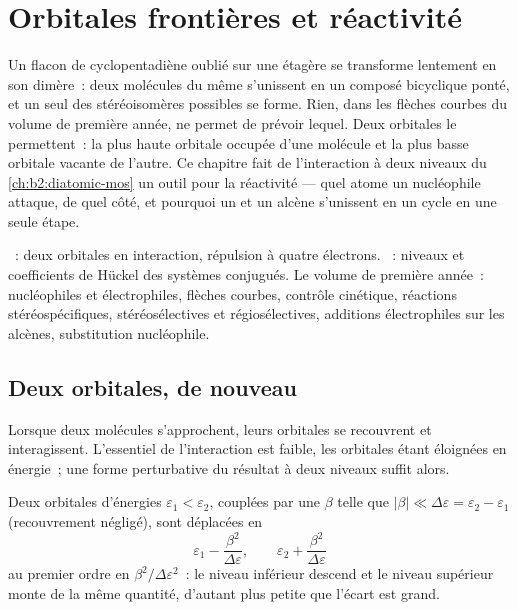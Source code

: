 \chapter{Orbitales frontières et réactivité}\label{ch:b2:frontier-orbitals}

Un flacon de cyclopentadiène oublié sur une étagère se transforme lentement en son dimère~:
deux molécules du même  s'unissent en un composé bicyclique ponté, et
un seul des stéréoisomères possibles se forme. Rien, dans les flèches courbes du
volume de première année, ne permet de prévoir lequel. Deux orbitales le permettent~: la plus haute orbitale
occupée d'une molécule et la plus basse orbitale vacante de l'autre. Ce
chapitre fait de l'interaction à deux niveaux du \cref{ch:b2:diatomic-mos} un
outil pour la réactivité --- quel atome un nucléophile attaque, de quel côté, et
pourquoi un  et un alcène s'unissent en un cycle en une seule étape.

\begin{recall}
~: deux orbitales en interaction, répulsion à quatre électrons.
~: niveaux et coefficients de Hückel des systèmes conjugués.
Le volume de première année~: nucléophiles et électrophiles, flèches courbes, contrôle
cinétique, réactions stéréospécifiques, stéréosélectives et régiosélectives,
additions électrophiles sur les alcènes, substitution nucléophile.
\end{recall}

\section{Deux orbitales, de nouveau}

Lorsque deux molécules s'approchent, leurs orbitales se recouvrent et interagissent. L'essentiel de
l'interaction est faible, les orbitales étant éloignées en énergie~; une forme perturbative du
résultat à deux niveaux suffit alors.

\begin{theorem}\label{thm:b2:frontier-orbitals:perturbation}
Deux orbitales d'énergies $\varepsilon_1 < \varepsilon_2$, couplées par une 
$\beta$ telle que $|\beta| \ll \Delta\varepsilon = \varepsilon_2 - \varepsilon_1$ (recouvrement négligé), sont
déplacées en
\[
  \varepsilon_1 - \frac{\beta^2}{\Delta\varepsilon}, \qquad \varepsilon_2 + \frac{\beta^2}{\Delta\varepsilon}
\]
au premier ordre en $\beta^2/\Delta\varepsilon^2$~: le niveau inférieur descend et le niveau supérieur monte de la même
quantité, d'autant plus petite que l'écart est grand.
\end{theorem}


